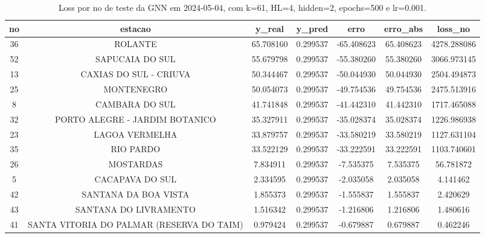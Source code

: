 \begin{table}[h]
\centering
\caption{Loss por no de teste da GNN em 2024-05-04, com k=61, HL=4, hidden=2, epochs=500 e lr=0.001.}
\label{tab:gnn_loss_k61_hl4_h2_e500_d20240504}
\begin{tabular}{ccccccc}
\toprule
no & estacao & y\_real & y\_pred & erro & erro\_abs & loss\_no \\
\midrule
36 & ROLANTE & 65.708160 & 0.299537 & -65.408623 & 65.408623 & 4278.288086 \\
52 & SAPUCAIA DO SUL & 55.679798 & 0.299537 & -55.380260 & 55.380260 & 3066.973145 \\
13 & CAXIAS DO SUL - CRIUVA & 50.344467 & 0.299537 & -50.044930 & 50.044930 & 2504.494873 \\
25 & MONTENEGRO & 50.054073 & 0.299537 & -49.754536 & 49.754536 & 2475.513916 \\
8 & CAMBARA DO SUL & 41.741848 & 0.299537 & -41.442310 & 41.442310 & 1717.465088 \\
32 & PORTO ALEGRE - JARDIM BOTANICO & 35.327911 & 0.299537 & -35.028374 & 35.028374 & 1226.986938 \\
23 & LAGOA VERMELHA & 33.879757 & 0.299537 & -33.580219 & 33.580219 & 1127.631104 \\
35 & RIO PARDO & 33.522129 & 0.299537 & -33.222591 & 33.222591 & 1103.740601 \\
26 & MOSTARDAS & 7.834911 & 0.299537 & -7.535375 & 7.535375 & 56.781872 \\
5 & CACAPAVA DO SUL & 2.334595 & 0.299537 & -2.035058 & 2.035058 & 4.141462 \\
42 & SANTANA DA BOA VISTA & 1.855373 & 0.299537 & -1.555837 & 1.555837 & 2.420629 \\
43 & SANTANA DO LIVRAMENTO & 1.516342 & 0.299537 & -1.216806 & 1.216806 & 1.480616 \\
41 & SANTA VITORIA DO PALMAR (RESERVA DO TAIM) & 0.979424 & 0.299537 & -0.679887 & 0.679887 & 0.462246 \\
\bottomrule
\end{tabular}
\end{table}
